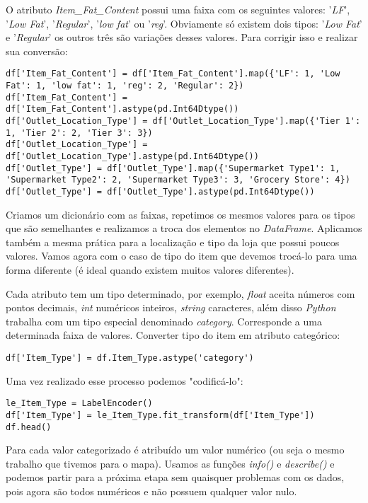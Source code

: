O atributo \textit{Item\_Fat\_Content} possui uma faixa com os seguintes valores: '\textit{LF}', '\textit{Low Fat}', '\textit{Regular}', '\textit{low fat}' ou '\textit{reg}'. Obviamente só existem dois tipos: '\textit{Low Fat}' e '\textit{Regular}' os outros três são variações desses valores. Para corrigir isso e realizar sua conversão: 
\begin{lstlisting}[]
df['Item_Fat_Content'] = df['Item_Fat_Content'].map({'LF': 1, 'Low Fat': 1, 'low fat': 1, 'reg': 2, 'Regular': 2})
df['Item_Fat_Content'] = df['Item_Fat_Content'].astype(pd.Int64Dtype())
df['Outlet_Location_Type'] = df['Outlet_Location_Type'].map({'Tier 1': 1, 'Tier 2': 2, 'Tier 3': 3})
df['Outlet_Location_Type'] = df['Outlet_Location_Type'].astype(pd.Int64Dtype())
df['Outlet_Type'] = df['Outlet_Type'].map({'Supermarket Type1': 1, 'Supermarket Type2': 2, 'Supermarket Type3': 3, 'Grocery Store': 4})
df['Outlet_Type'] = df['Outlet_Type'].astype(pd.Int64Dtype())
\end{lstlisting}

Criamos um dicionário com as faixas, repetimos os mesmos valores para os tipos que são semelhantes e realizamos a troca dos elementos no \textit{DataFrame}. Aplicamos também a mesma prática para a localização e tipo da loja que possui poucos valores. Vamos agora com o caso de tipo do item que devemos trocá-lo para uma forma diferente (é ideal quando existem muitos valores diferentes).

Cada atributo tem um tipo determinado, por exemplo, \textit{float} aceita números com pontos decimais, \textit{int} numéricos inteiros, \textit{string} caracteres, além disso \textit{Python} trabalha com um tipo especial denominado \textit{category}. Corresponde a uma determinada faixa de valores. Converter tipo do item em atributo categórico:
\begin{lstlisting}[]
df['Item_Type'] = df.Item_Type.astype('category')
\end{lstlisting}

Uma vez realizado esse processo podemos "codificá-lo":
\begin{lstlisting}[]
le_Item_Type = LabelEncoder()
df['Item_Type'] = le_Item_Type.fit_transform(df['Item_Type'])
df.head()
\end{lstlisting}

Para cada valor categorizado é atribuído um valor numérico (ou seja o mesmo trabalho que tivemos para o mapa). Usamos as funções \textit{info()} e \textit{describe()} e podemos partir para a próxima etapa sem quaisquer problemas com os dados, pois agora são todos numéricos e não possuem qualquer valor nulo.

